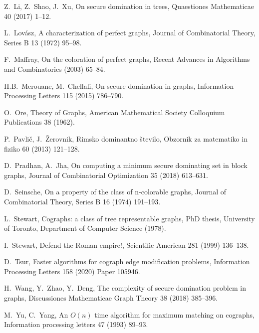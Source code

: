 \documentclass[12pt,a4paper,twoside]{article}
\theoremstyle{definition} %
\theoremstyle{plain} %
\numberwithin{equation}{section}  %
\begin{document}
\begin{thebibliography}{99}
    Z.~Li, Z.~Shao, J.~Xu,
    On secure domination in trees,
    Quaestiones Mathematicae 40 (2017) 1--12.
    
    L.~Lovász,
    A characterization of perfect graphs,
    Journal of Combinatorial Theory, Series B 13 (1972) 95--98.
    
    F.~Maffray,
    On the coloration of perfect graphs,
    Recent Advances in Algorithms and Combinatorics (2003) 65--84.
 
    H.B.~Merouane, M.~Chellali,
    On secure domination in graphs,
    Information Processing Letters 115 (2015) 786--790.
    
    O.~Ore,
    Theory of Graphs,
    American Mathematical Society Colloquium Publications 38 (1962).

    P.~Pavlič, J.~Žerovnik,
    Rimsko dominantno število,
    Obzornik za matematiko in fiziko 60 (2013) 121--128.
    
    D.~Pradhan, A.~Jha,
    On computing a minimum secure dominating set in block graphs,
    Journal of Combinatorial Optimization 35 (2018) 613--631.
    
    D.~Seinsche,
    On a property of the class of n-colorable graphs,
    Journal of Combinatorial Theory, Series B 16 (1974) 191--193.
    
    L.~Stewart,
    Cographs: a class of tree representable graphs,
    PhD thesis,
    University of Toronto, Department of Computer Science (1978).
    
    I.~Stewart,
    Defend the Roman empire!,
    Scientific American 281 (1999) 136--138.
    
    D.~Tsur,
    Faster algorithms for cograph edge modification problems,
    Information Processing Letters 158 (2020) Paper 105946. 

    H.~Wang, Y.~Zhao, Y.~Deng,
    The complexity of secure domination problem in graphs,
    Discussiones Mathematicae Graph Theory 38 (2018) 385--396.
    
    M.~Yu, C.~Yang,
    An $O(n)$ time algorithm for maximum matching on cographs,
    Information processing letters 47 (1993) 89--93.
    
\end{thebibliography}



\cleardoublepage                           %
\printindex
\end{document}
